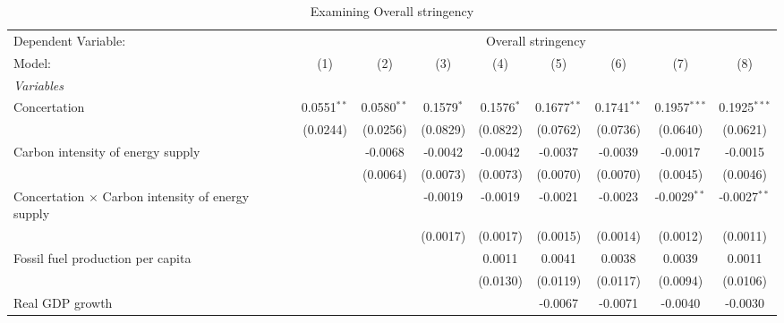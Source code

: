 
\begin{table}[htbp]
   \caption{Examining Overall stringency}
   \centering
   \begin{tabular}{lcccccccc}
      \tabularnewline \midrule \midrule
      Dependent Variable: & \multicolumn{8}{c}{Overall stringency}\\
      Model:                                                   & (1)           & (2)           & (3)          & (4)          & (5)           & (6)           & (7)            & (8)\\  
      \midrule
      \emph{Variables}\\
      Concertation                                             & 0.0551$^{**}$ & 0.0580$^{**}$ & 0.1579$^{*}$ & 0.1576$^{*}$ & 0.1677$^{**}$ & 0.1741$^{**}$ & 0.1957$^{***}$ & 0.1925$^{***}$\\   
                                                               & (0.0244)      & (0.0256)      & (0.0829)     & (0.0822)     & (0.0762)      & (0.0736)      & (0.0640)       & (0.0621)\\   
      Carbon intensity of energy supply                        &               & -0.0068       & -0.0042      & -0.0042      & -0.0037       & -0.0039       & -0.0017        & -0.0015\\   
                                                               &               & (0.0064)      & (0.0073)     & (0.0073)     & (0.0070)      & (0.0070)      & (0.0045)       & (0.0046)\\   
      Concertation $\times$ Carbon intensity of energy supply  &               &               & -0.0019      & -0.0019      & -0.0021       & -0.0023       & -0.0029$^{**}$ & -0.0027$^{**}$\\   
                                                               &               &               & (0.0017)     & (0.0017)     & (0.0015)      & (0.0014)      & (0.0012)       & (0.0011)\\   
      Fossil fuel production per capita                        &               &               &              & 0.0011       & 0.0041        & 0.0038        & 0.0039         & 0.0011\\   
                                                               &               &               &              & (0.0130)     & (0.0119)      & (0.0117)      & (0.0094)       & (0.0106)\\   
      Real GDP growth                                          &               &               &              &              & -0.0067       & -0.0071       & -0.0040        & -0.0030\\   

\end{tabular}
\end{table}
